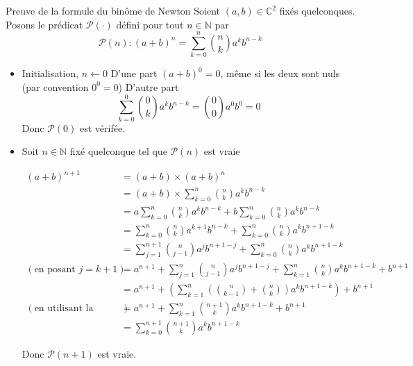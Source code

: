 \documentclass{article}
\begin{document}
\begin{question_kholle}[{Pour tout $(a, b) \in \C^2$, $n \in \N$: $$(a+b)^{n} = \sum_{k=0}^{n}\binom n k a^{k} b^{n-k}$$}]{Preuve de la formule du binôme de Newton}
    Soient $(a, b) \in \mathbb{C}^{2}$ fixés quelconques.
    Posons le prédicat $\mathcal{P}(\cdot)$ défini pour tout $n \in \mathbb{N}$ par
    $$
    \mathcal{P}(n): (a+b)^{n} = \sum_{k=0}^{n}\binom n k a^{k} b^{n-k}
    $$
    \begin{itemize}[label=$\star$]
        \item Initialisation, $n \leftarrow 0$
        D'une part $(a+b)^{0} = 0$, même si les deux sont nuls (par convention $0^{0} =0$)
        D'autre part
        $$
        \sum_{k=0}^{0}\binom 0 k a^{k}b^{n-k} = \binom 0 0 a^{0} b^{0} = 0
        $$
        Donc $\mathcal{P}(0)$ est vérifée.
        
        \item Soit $n \in \mathbb{N}$ fixé quelconque tel que $\mathcal{P}(n)$ est vraie
        
        \begin{align*}
            (a+b)^{n+1} &= (a+b)\times(a+b)^{n} \\
            &= (a+b) \times \sum_{k=0}^{n}\binom n k a^{k} b^{n-k} \\
            &= a\sum_{k=0}^{n}\binom n k a^{k} b^{n-k} + b\sum_{k=0}^{n}\binom n k a^{k} b^{n-k} \\
            &= \sum_{k=0}^{n}\binom n k a^{k+1} b^{n-k} + \sum_{k=0}^{n}\binom n k a^{k} b^{n+1-k} \\
            &= \sum_{j=1}^{n+1}\binom n {j-1} a^{j} b^{n+1-j} + \sum_{k=0}^{n}\binom n k a^{k} b^{n+1-k} \\
            (\text{en posant } j = k + 1) &= a^{n+1} + \sum_{j=1}^{n}\binom n {j-1} a^{j} b^{n+1-j} + \sum_{k=1}^{n}\binom n k a^{k} b^{n+1-k} + b^{n+1} \\
            &= a^{n+1} + \left( \sum_{k=1}^{n} \left(\binom n {k-1} + \binom n k \right) a^{k} b^{n+1-k} \right) + b^{n+1} \\
            (\text{en utilisant la relation de Pascal}) &= a^{n+1} + \sum_{k=1}^{n} \binom {n+1} k a^{k} b^{n+1-k} + b^{n+1} \\
            &=\sum_{k=0}^{n+1} \binom {n+1} k a^{k} b^{n+1-k}
        \end{align*}
        
        Donc $\mathcal{P}(n+1)$ est vraie.
    \end{itemize}
\end{question_kholle}
\end{document}
